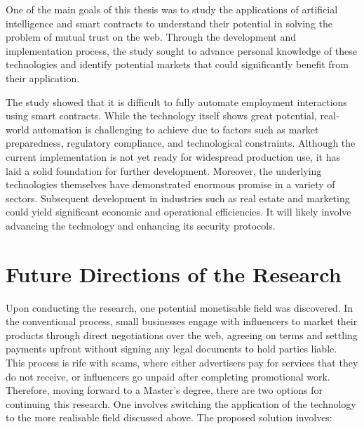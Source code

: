 One of the main goals of this thesis was to study the applications of artificial intelligence and smart contracts to understand their potential in solving the problem of mutual trust on the web. Through the development and implementation process, the study sought to advance personal knowledge of these technologies and identify potential markets that could significantly benefit from their application.

The study showed that it is difficult to fully automate employment interactions using smart contracts. While the technology itself shows great potential, real-world automation is challenging to achieve due to factors such as market preparedness, regulatory compliance, and technological constraints. Although the current implementation is not yet ready for widespread production use, it has laid a solid foundation for further development. Moreover, the underlying technologies themselves have demonstrated enormous promise in a variety of sectors. Subsequent development in industries such as real estate and marketing could yield significant economic and operational efficiencies. It will likely involve advancing the technology and enhancing its security protocols.

\section{Future Directions of the Research}

Upon conducting the research, one potential monetisable field was discovered. In the conventional process, small businesses engage with influencers to market their products through direct negotiations over the web, agreeing on terms and settling payments upfront without signing any legal documents to hold parties liable. This process is rife with scams, where either advertisers pay for services that they do not receive, or influencers go unpaid after completing promotional work. Therefore, moving forward to a Master's degree, there are two options for continuing this research. One involves switching the application of the technology to the more realisable field discussed above. The proposed solution involves:

